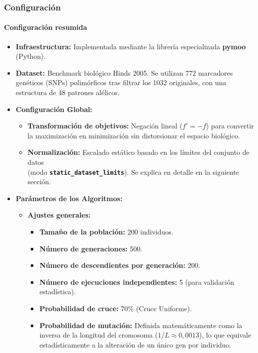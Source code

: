 \documentclass[a4paper,10pt]{article} %
\begin{document}
\subsubsection{Configuración}

\paragraph{Configuración resumida}
\begin{itemize}
    \item \textbf{Infraestructura:} Implementada mediante la librería especializada \textbf{pymoo} (Python).
    \item \textbf{Dataset:} Benchmark biológico Hinds 2005. Se utilizan 772 marcadores genéticos (SNPs) polimórficos tras filtrar los 1032 originales, con una estructura de 48 patrones alélicos.
    \item \textbf{Configuración Global:}
    \begin{itemize}
        \item \textbf{Transformación de objetivos:} Negación lineal ($f' = -f$) para convertir la maximización en minimización sin distorsionar el espacio biológico.
        \item \textbf{Normalización:} Escalado estático basado en los límites del conjunto de datos \\ (modo \textbf{\texttt{static\_dataset\_limits}}). Se explica en detalle en la siguiente sección.
    \end{itemize}
    \item \textbf{Parámetros de los Algoritmos:}
    \begin{itemize}
        \item \textbf{Ajustes generales:}
        \begin{itemize}
            \item \textbf{Tamaño de la población:} 200 individuos.
            \item \textbf{Número de generaciones:} 500.
            \item \textbf{Número de descendientes por generación:} 200.
            \item \textbf{Número de ejecuciones independientes:} 5 (para validación estadística).
            \item \textbf{Probabilidad de cruce:} 70\% (Cruce Uniforme).
            \item \textbf{Probabilidad de mutación:} Definida matemáticamente como la inversa de la longitud del cromosoma ($1/L \approx 0,0013$), lo que equivale estadísticamente a la alteración de un único gen por individuo.

\end{itemize}
\end{itemize}
\end{itemize}
\end{document}
